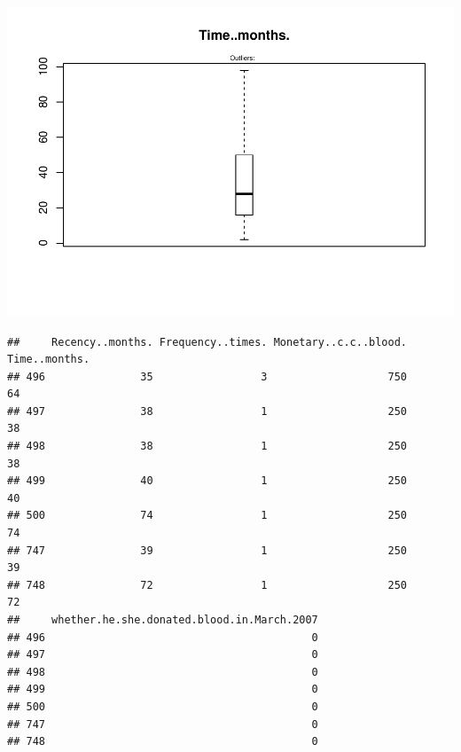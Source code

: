 \documentclass[
]{article}
\newenvironment{Shaded}{\begin{snugshade}}{\end{snugshade}}
\newcommand{\CommentTok}[1]{\textcolor[rgb]{0.56,0.35,0.01}{\textit{#1}}}
\newcommand{\KeywordTok}[1]{\textcolor[rgb]{0.13,0.29,0.53}{\textbf{#1}}}
\newcommand{\NormalTok}[1]{#1}
\newcommand{\OperatorTok}[1]{\textcolor[rgb]{0.81,0.36,0.00}{\textbf{#1}}}
\newcommand{\StringTok}[1]{\textcolor[rgb]{0.31,0.60,0.02}{#1}}
\begin{document}
\includegraphics{assessment-1_files/figure-latex/unnamed-chunk-19-4.pdf}

\begin{Shaded}
\end{Shaded}

\begin{verbatim}
##     Recency..months. Frequency..times. Monetary..c.c..blood. Time..months.
## 496               35                 3                   750            64
## 497               38                 1                   250            38
## 498               38                 1                   250            38
## 499               40                 1                   250            40
## 500               74                 1                   250            74
## 747               39                 1                   250            39
## 748               72                 1                   250            72
##     whether.he.she.donated.blood.in.March.2007
## 496                                          0
## 497                                          0
## 498                                          0
## 499                                          0
## 500                                          0
## 747                                          0
## 748                                          0
\end{verbatim}
\end{document}
